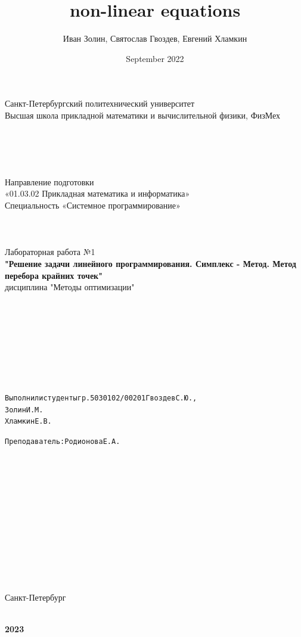 \documentclass{article}
\title{non-linear equations}
\author{Иван Золин, Святослав Гвоздев, Евгений Хламкин}
\date{September 2022}
\begin{document}
	\large
	\begin{center}

		Санкт-Петербургский политехнический университет\\
		Высшая школа прикладной математики и вычислительной физики, ФизМех

		~\\
		~\\
		~\\
		~\\
		Направление подготовки\\
		«01.03.02 Прикладная математика и информатика»\\
		Специальность «Системное программирование»
		~\\
		~\\
		~\\
		~\\
	Лабораторная работа №1\\
		\textbf{"Решение задачи линейного программирования. Симплекс - Метод. Метод перебора крайних точек"}\\
	дисциплина "Методы оптимизации"\\
	\end{center}
	~\\
	~\\
	~\\
	~\\
	~\\
	~\\
	~\\
	\begin{alltt}
        	Выполнили студенты гр. 5030102/00201		      Гвоздев С.Ю.,
        		                                           Золин И.М.
        		                                           Хламкин Е.В.

        	Преподаватель: 				              	            Родионова Е.А.
	\end{alltt}

	~\\
	~\\
	~\\
	~\\
	~\\
	~\\
	~\\
	~\\
	~\\
	~\\
	~\\
	\begin{center}
		Санкт-Петербург

		~\\
		\textbf{2023}
	\end{center}
\end{document}

